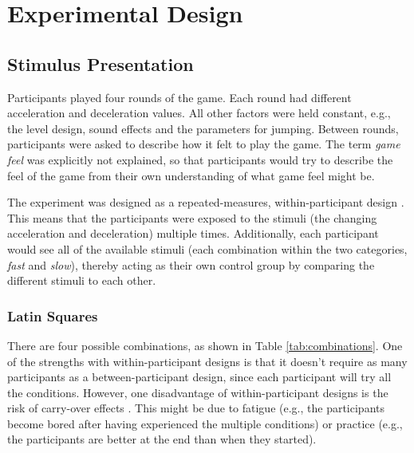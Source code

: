 \section{Experimental Design} \label{experimentalDesign}

\subsection{Stimulus Presentation}
Participants played four rounds of the game. Each round had different acceleration and deceleration values. All other factors were held constant, e.g., the level design, sound effects and the parameters for jumping. Between rounds, participants were asked to describe how it felt to play the game. The term \textit{game feel} was explicitly not explained, so that participants would try to describe the feel of the game from their own understanding of what game feel might be.

The experiment was designed as a repeated-measures, within-participant design \cite{cunningham}. This means that the participants were exposed to the stimuli (the changing acceleration and deceleration) multiple times. Additionally, each participant would see all of the available stimuli (each combination within the two categories, \textit{fast} and \textit{slow}), thereby acting as their own control group by comparing the different stimuli to each other.

\subsubsection{Latin Squares} \label{latinSection}
There are four possible combinations, as shown in Table \ref{tab:combinations}. One of the strengths with within-participant designs is that it doesn't require as many participants as a between-participant design, since each participant will try all the conditions. However, one disadvantage of within-participant designs is the risk of carry-over effects \cite{experimental1}. This might be due to fatigue (e.g., the participants become bored after having experienced the multiple conditions) or practice (e.g., the participants are better at the end than when they started).

